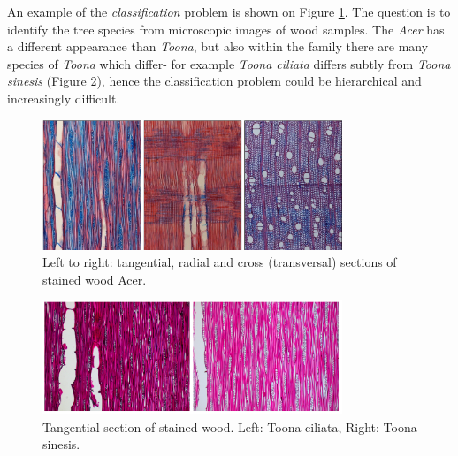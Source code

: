 An example of the {\em classification} problem is shown on Figure \ref{fig:woodphotoid}. The question is to identify the tree species from microscopic images of wood samples. The {\em Acer} has a different appearance than {\em Toona}, but also within the family there are many species of {\em Toona} which differ- for example {\em Toona ciliata} differs subtly from {\em Toona sinesis} (Figure \ref{fig:treeid}), hence the classification problem could be hierarchical and increasingly difficult.

\begin{figure}[H]
\begin{center}
\includegraphics[width=0.8\textwidth]{fig/woodphotoid}
\end{center}
\caption{Left to right: tangential, radial and cross (transversal) sections of stained wood Acer.}
\label{fig:woodphotoid}
\end{figure}

\begin{figure}[H]
\begin{center}
\includegraphics[width=0.8\textwidth]{fig/treeid}
\end{center}
\caption{Tangential section of stained wood. Left: Toona ciliata, Right: Toona sinesis.}
\label{fig:treeid}
\end{figure}

